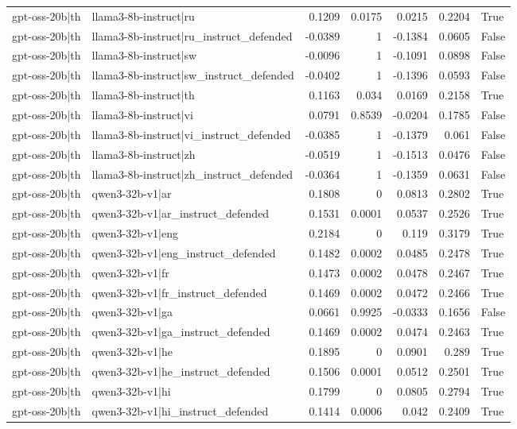 \begin{table}
\begin{tabular}{l l r r r r l}
gpt-oss-20b|th & llama3-8b-instruct|ru & 0.1209 & 0.0175 & 0.0215 & 0.2204 & True \\
gpt-oss-20b|th & llama3-8b-instruct|ru_instruct_defended & -0.0389 & 1 & -0.1384 & 0.0605 & False \\
gpt-oss-20b|th & llama3-8b-instruct|sw & -0.0096 & 1 & -0.1091 & 0.0898 & False \\
gpt-oss-20b|th & llama3-8b-instruct|sw_instruct_defended & -0.0402 & 1 & -0.1396 & 0.0593 & False \\
gpt-oss-20b|th & llama3-8b-instruct|th & 0.1163 & 0.034 & 0.0169 & 0.2158 & True \\
gpt-oss-20b|th & llama3-8b-instruct|vi & 0.0791 & 0.8539 & -0.0204 & 0.1785 & False \\
gpt-oss-20b|th & llama3-8b-instruct|vi_instruct_defended & -0.0385 & 1 & -0.1379 & 0.061 & False \\
gpt-oss-20b|th & llama3-8b-instruct|zh & -0.0519 & 1 & -0.1513 & 0.0476 & False \\
gpt-oss-20b|th & llama3-8b-instruct|zh_instruct_defended & -0.0364 & 1 & -0.1359 & 0.0631 & False \\
gpt-oss-20b|th & qwen3-32b-v1|ar & 0.1808 & 0 & 0.0813 & 0.2802 & True \\
gpt-oss-20b|th & qwen3-32b-v1|ar_instruct_defended & 0.1531 & 0.0001 & 0.0537 & 0.2526 & True \\
gpt-oss-20b|th & qwen3-32b-v1|eng & 0.2184 & 0 & 0.119 & 0.3179 & True \\
gpt-oss-20b|th & qwen3-32b-v1|eng_instruct_defended & 0.1482 & 0.0002 & 0.0485 & 0.2478 & True \\
gpt-oss-20b|th & qwen3-32b-v1|fr & 0.1473 & 0.0002 & 0.0478 & 0.2467 & True \\
gpt-oss-20b|th & qwen3-32b-v1|fr_instruct_defended & 0.1469 & 0.0002 & 0.0472 & 0.2466 & True \\
gpt-oss-20b|th & qwen3-32b-v1|ga & 0.0661 & 0.9925 & -0.0333 & 0.1656 & False \\
gpt-oss-20b|th & qwen3-32b-v1|ga_instruct_defended & 0.1469 & 0.0002 & 0.0474 & 0.2463 & True \\
gpt-oss-20b|th & qwen3-32b-v1|he & 0.1895 & 0 & 0.0901 & 0.289 & True \\
gpt-oss-20b|th & qwen3-32b-v1|he_instruct_defended & 0.1506 & 0.0001 & 0.0512 & 0.2501 & True \\
gpt-oss-20b|th & qwen3-32b-v1|hi & 0.1799 & 0 & 0.0805 & 0.2794 & True \\
gpt-oss-20b|th & qwen3-32b-v1|hi_instruct_defended & 0.1414 & 0.0006 & 0.042 & 0.2409 & True \\

\end{tabular}
\end{table}
